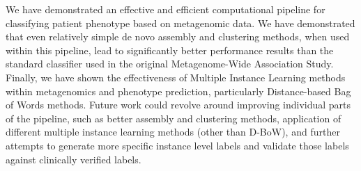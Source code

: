 
We have demonstrated an effective and efficient computational pipeline for classifying patient phenotype based on metagenomic data. We have demonstrated that even relatively simple de novo assembly and clustering methods, when used within this pipeline, lead to significantly better performance results than the standard classifier used in the original Metagenome-Wide Association Study. Finally, we have shown the effectiveness of Multiple Instance Learning methods within metagenomics and phenotype prediction, particularly Distance-based Bag of Words methods. Future work could revolve around improving individual parts of the pipeline, such as better assembly and clustering methods, application of different multiple instance learning methods (other than D-BoW), and further attempts to generate more specific instance level labels and validate those labels against clinically verified labels.
